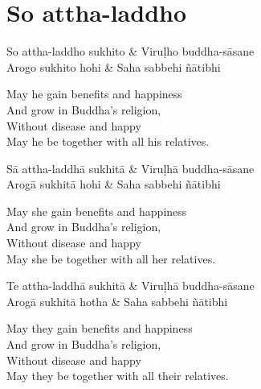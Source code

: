
\section{So attha-laddho}

\begin{twochants}
  So attha-laddho sukhito & Viruḷho buddha-sāsane\\
  Arogo sukhito hohi & Saha sabbehi ñātibhi
\end{twochants}

\begin{english}
  May he gain benefits and happiness\\
  And grow in Buddha’s religion,\\
  Without disease and happy\\
  May he be together with all his relatives.
\end{english}

\begin{twochants}
  Sā attha-laddhā sukhitā & Viruḷhā buddha-sāsane\\
  Arogā sukhitā hohi & Saha sabbehi ñātibhi
\end{twochants}

\begin{english}
  May she gain benefits and happiness\\
  And grow in Buddha’s religion,\\
  Without disease and happy\\
  May she be together with all her relatives.
\end{english}

\begin{twochants}
  Te attha-laddhā sukhitā & Viruḷhā buddha-sāsane\\
  Arogā sukhitā hotha & Saha sabbehi ñātibhi
\end{twochants}

\begin{english}
  May they gain benefits and happiness\\
  And grow in Buddha’s religion,\\
  Without disease and happy\\
  May they be together with all their relatives.
\end{english}

